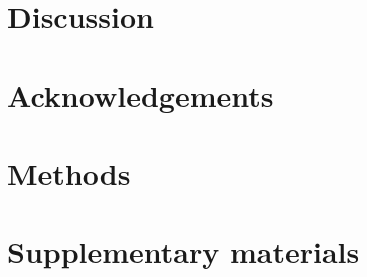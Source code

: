 \documentclass[a4paper,10pt]{article}
\begin{document}
\section{Discussion}


\section{Acknowledgements}

\section{Methods}





\section{Supplementary materials}

\setcounter{table}{0}
\renewcommand{\thetable}{S\arabic{table}}
\setcounter{figure}{0}
\renewcommand{\thefigure}{S\arabic{figure}}
\end{document}
